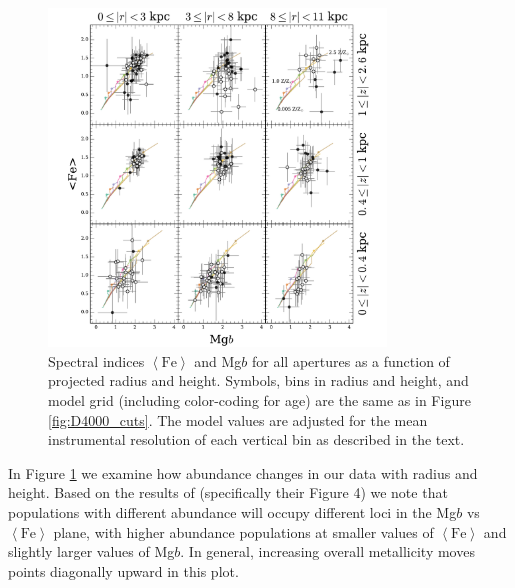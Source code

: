 \begin{figure}
  \centering
  \includegraphics[width=0.8\textwidth]{891_1/figs/Mgb_multires.pdf}
  \caption[Mg$b$ vs $\left<\mathrm{Fe}\right>$ in radius and height
  bins]{\label{fig:Mgb_cuts}\fixspacing Spectral indices
    $\left<\mathrm{Fe}\right>$ and Mg$b$ for all apertures as a
    function of projected radius and height. Symbols, bins in radius
    and height, and model grid (including color-coding for age) are
    the same as in Figure \ref{fig:D4000_cuts}. The model values are
    adjusted for the mean instrumental resolution of each vertical bin
    as described in the text.}
\end{figure}

In Figure \ref{fig:Mgb_cuts} we examine how abundance changes in our
data with radius and height. Based on the results of \citet{Thomas03}
(specifically their Figure 4) we note that populations with different
abundance will occupy different loci in the Mg$b$ vs
$\left<\mathrm{Fe}\right>$ plane, with higher abundance populations at
smaller values of $\left<\mathrm{Fe}\right>$ and slightly larger
values of Mg$b$. In general, increasing overall metallicity moves
points diagonally upward in this plot.

